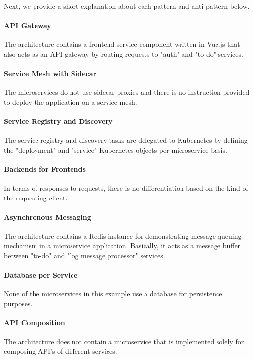 \documentclass{Configuration_Files/PoliMi3i_thesis}
\begin{document}
Next, we provide a short explanation about each pattern and anti-pattern below.

\paragraph{API Gateway} The architecture contains a frontend service component written in Vue.js that also acts as an API gateway by routing requests to "auth" and "to-do" services.

\paragraph{Service Mesh with Sidecar} The microservices do not use sidecar proxies and there is no instruction provided to deploy the application on a service mesh.

\paragraph{Service Registry and Discovery} The service registry and discovery tasks are delegated to Kubernetes by defining the "deployment" and "service" Kubernetes objects per microservice basis.

\paragraph{Backends for Frontends} In terms of responses to requests, there is no differentiation based on the kind of the requesting client.

\paragraph{Asynchronous Messaging} The architecture contains a Redis instance for demonstrating message queuing mechanism in a microservice application.
Basically, it acts as a message buffer between "to-do" and "log message processor" services.

\paragraph{Database per Service} None of the microservices in this example use a database for persistence purposes.

\paragraph{API Composition} The architecture does not contain a microservice that is implemented solely for composing API's of different services.
\end{document}
